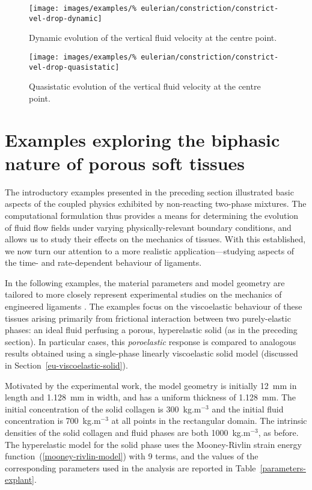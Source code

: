\begin{figure}[!hptb]
\centering
\texttt{[image: images/examples/\%
eulerian/constriction/constrict-vel-drop-dynamic]}
\caption{Dynamic evolution of the vertical fluid velocity at the
  centre point.}
\label{velocity-evolution-dynamic}
\end{figure}

\begin{figure}[!hptb]
\centering
\texttt{[image: images/examples/\%
eulerian/constriction/constrict-vel-drop-quasistatic]}
\caption{Quasistatic evolution of the vertical fluid velocity at the
  centre point.}
\label{velocity-evolution-quasistatic}
\end{figure}

\clearpage

\section{Examples exploring the biphasic nature of porous soft
  tissues}
\label{biphasic-examples-2}

The introductory examples presented in the preceding section
illustrated basic aspects of the coupled physics exhibited by
non-reacting two-phase mixtures. The computational formulation thus
provides a means for determining the evolution of fluid flow fields
under varying physically-relevant boundary conditions, and allows us
to study their effects on the mechanics of tissues. With this
established, we now turn our attention to a more realistic
application---studying aspects of the time- and rate-dependent
behaviour of ligaments.

In the following examples, the material parameters and model geometry
are tailored to more closely represent experimental studies on the
mechanics of engineered ligaments \citep{Calvethesis:06}. The examples
focus on the viscoelastic behaviour of these tissues arising primarily
from frictional interaction between two purely-elastic phases: an
ideal fluid perfusing a porous, hyperelastic solid (as in the
preceding section). In particular cases, this {\em poroelastic}
response is compared to analogous results obtained using a
single-phase linearly viscoelastic solid model (discussed in
Section~\ref{eu-viscoelastic-solid}).

Motivated by the experimental work, the model geometry is initially
12~mm in length and 1.128~mm in width, and has a uniform thickness of
1.128~mm. The initial concentration of the solid collagen is
300~kg.m$^{-3}$ and the initial fluid concentration is 700~kg.m$^{-3}$
at all points in the rectangular domain. The intrinsic densities of
the solid collagen and fluid phases are both 1000~kg.m$^{-3}$, as
before. The hyperelastic model for the solid phase uses the
Mooney-Rivlin strain energy function~(\ref{mooney-rivlin-model}) with
9 terms, and the values of the corresponding parameters used in the
analysis are reported in Table~\ref{parameters-explant}.

